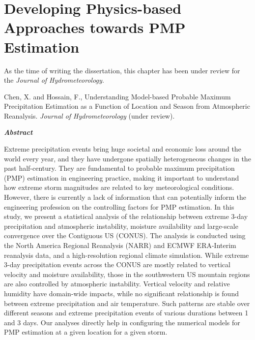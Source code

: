 \chapter {Developing Physics-based Approaches towards PMP Estimation}
\label{ch:JHM}

 
As the time of writing the dissertation, this chapter has been under review for the \textit{Journal of Hydrometeorology}.\\

\bigbreak

\noindent
{}
\setlength{\hangindent}{2em}
Chen, X. and Hossain, F., Understanding Model-based Probable Maximum Precipitation Estimation as a Function of Location and Season from Atmospheric Reanalysis. \textit{Journal of Hydrometeorology} (under review).

\vspace{10mm}

\noindent
\textit{\textbf{Abstract}}
 
Extreme precipitation events bring huge societal and economic loss around the world every year, and they have undergone spatially heterogeneous changes in the past half-century. They are fundamental to probable maximum precipitation (PMP) estimation in engineering practice, making it important to understand how extreme storm magnitudes are related to key meteorological conditions. However, there is currently a lack of information that can potentially inform the engineering profession on the controlling factors for PMP estimation. In this study, we present a statistical analysis of the relationship between extreme 3-day precipitation and atmospheric instability, moisture availability and large-scale convergence over the Contiguous US (CONUS). The analysis is conducted using the North America Regional Reanalysis (NARR) and ECMWF ERA-Interim reanalysis data, and a high-resolution regional climate simulation. While extreme 3-day precipitation events across the CONUS are mostly related to vertical velocity and moisture availability, those in the southwestern US mountain regions are also controlled by atmospheric instability. Vertical velocity and relative humidity have domain-wide impacts, while no significant relationship is found between extreme precipitation and air temperature. Such patterns are stable over different seasons and extreme precipitation events of various durations between 1 and 3 days. Our analyses directly help in configuring the numerical models for PMP estimation at a given location for a given storm.

